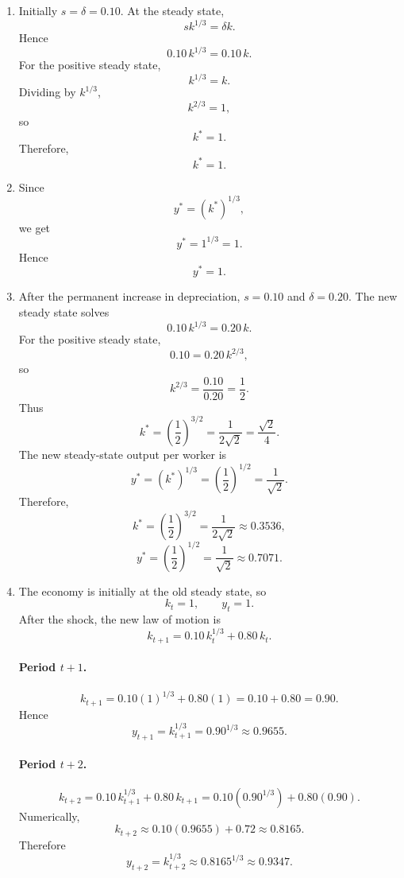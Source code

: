 \documentclass[12pt]{article}
\begin{document}
\begin{enumerate}[label=(\alph*)]
    \item
    Initially \(s=\delta=0.10\). At the steady state,
    \[
    s k^{1/3}=\delta k.
    \]
    Hence
    \[
    0.10\,k^{1/3}=0.10\,k.
    \]
    For the positive steady state,
    \[
    k^{1/3}=k.
    \]
    Dividing by \(k^{1/3}\),
    \[
    k^{2/3}=1,
    \]
    so
    \[
    k^*=1.
    \]
    Therefore,
    \[
    \boxed{k^*=1.}
    \]

    \item
    Since
    \[
    y^*=(k^*)^{1/3},
    \]
    we get
    \[
    y^*=1^{1/3}=1.
    \]
    Hence
    \[
    \boxed{y^*=1.}
    \]

    \item
    After the permanent increase in depreciation, \(s=0.10\) and \(\delta=0.20\). The new steady state solves
    \[
    0.10\,k^{1/3}=0.20\,k.
    \]
    For the positive steady state,
    \[
    0.10=0.20\,k^{2/3},
    \]
    so
    \[
    k^{2/3}=\frac{0.10}{0.20}=\frac{1}{2}.
    \]
    Thus
    \[
    k^*=\left(\frac{1}{2}\right)^{3/2}=\frac{1}{2\sqrt{2}}=\frac{\sqrt{2}}{4}.
    \]
    The new steady-state output per worker is
    \[
    y^*=(k^*)^{1/3}=\left(\frac{1}{2}\right)^{1/2}=\frac{1}{\sqrt{2}}.
    \]
    Therefore,
    \[
    \boxed{k^*=\left(\frac{1}{2}\right)^{3/2}=\frac{1}{2\sqrt{2}}\approx 0.3536,}
    \]
    \[
    \boxed{y^*=\left(\frac{1}{2}\right)^{1/2}=\frac{1}{\sqrt{2}}\approx 0.7071.}
    \]

    \item
    The economy is initially at the old steady state, so
    \[
    k_t=1,
    \qquad
    y_t=1.
    \]
    After the shock, the new law of motion is
    \[
    k_{t+1}=0.10\,k_t^{1/3}+0.80\,k_t.
    \]

    \paragraph{Period \(t+1\).}
    \[
    k_{t+1}=0.10(1)^{1/3}+0.80(1)=0.10+0.80=0.90.
    \]
    Hence
    \[
    y_{t+1}=k_{t+1}^{1/3}=0.90^{1/3}\approx 0.9655.
    \]

    \paragraph{Period \(t+2\).}
    \[
    k_{t+2}=0.10\,k_{t+1}^{1/3}+0.80\,k_{t+1}
    =0.10(0.90^{1/3})+0.80(0.90).
    \]
    Numerically,
    \[
    k_{t+2}\approx 0.10(0.9655)+0.72\approx 0.8165.
    \]
    Therefore
    \[
    y_{t+2}=k_{t+2}^{1/3}\approx 0.8165^{1/3}\approx 0.9347.
    \]


\end{enumerate}
\end{document}
